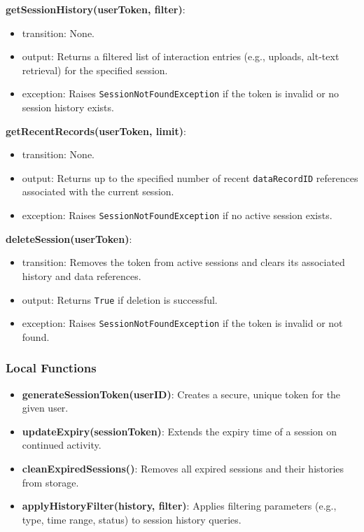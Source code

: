 \documentclass[12pt, titlepage]{article}
\begin{document}
\noindent \textbf{getSessionHistory(userToken, filter)}:
\begin{itemize}
  \item transition: None.
  \item output: Returns a filtered list of interaction entries (e.g.,
    uploads, alt-text retrieval) for the specified session.
  \item exception: Raises \texttt{SessionNotFoundException} if the
    token is invalid or no session history exists.
\end{itemize}

\noindent \textbf{getRecentRecords(userToken, limit)}:
\begin{itemize}
  \item transition: None.
  \item output: Returns up to the specified number of recent
    \texttt{dataRecordID} references associated with the current session.
  \item exception: Raises \texttt{SessionNotFoundException} if no
    active session exists.
\end{itemize}

\noindent \textbf{deleteSession(userToken)}:
\begin{itemize}
  \item transition: Removes the token from active sessions and clears
    its associated history and data references.
  \item output: Returns \texttt{True} if deletion is successful.
  \item exception: Raises \texttt{SessionNotFoundException} if the
    token is invalid or not found.
\end{itemize}

\subsubsection{Local Functions}
\begin{itemize}
  \item \textbf{generateSessionToken(userID)}: Creates a secure,
    unique token for the given user.
  \item \textbf{updateExpiry(sessionToken)}: Extends the expiry time
    of a session on continued activity.
  \item \textbf{cleanExpiredSessions()}: Removes all expired sessions
    and their histories from storage.
  \item \textbf{applyHistoryFilter(history, filter)}: Applies
    filtering parameters (e.g., type, time range, status) to session
    history queries.
\end{itemize}
\end{document}
